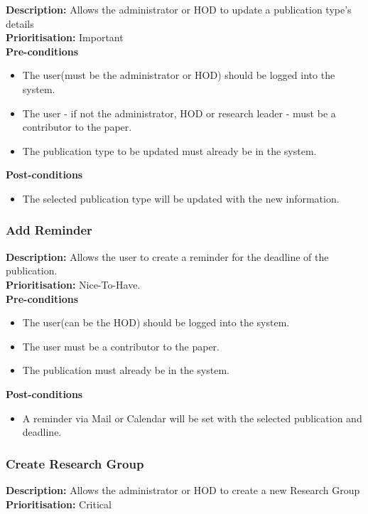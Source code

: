 \documentclass[a4paper]{article}
\begin{document}
    \textbf{Description:} Allows the administrator or HOD to update a publication type's details\\
    \textbf{Prioritisation:} Important\\
    
    
    \textbf{Pre-conditions}
     \begin{itemize}
        \item The user(must be the administrator or HOD) should be logged into the system.
        \item The user - if not the administrator, HOD or research leader - must be a contributor to the paper.
        \item The publication type to be updated must already be in the system.
   \end{itemize}
    
    \textbf{Post-conditions}
    \begin{itemize}
        \item The selected publication type will be updated with the new information.
    \end{itemize}
    
    \subsubsection{Add Reminder}
        \textbf{Description:} Allows the user to create a reminder for the deadline of the publication.\\
        \textbf{Prioritisation:} Nice-To-Have.
        \\
        
        \textbf{Pre-conditions}
        \begin{itemize}
        	\item The user(can be the HOD) should be logged into the system.
        	\item The user must be a contributor to the paper.
        	\item The publication must already be in the system.
        \end{itemize}
        
        \textbf{Post-conditions}
        \begin{itemize}
        	\item A reminder via Mail or Calendar will be set with the selected publication and deadline.
        \end{itemize}
    
	\subsubsection{Create Research Group}
	\textbf{Description:} Allows the administrator or HOD to create a new Research Group\\
	\textbf{Prioritisation:} Critical\\
	
\end{document}
